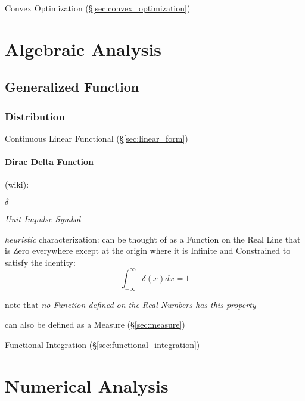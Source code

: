 Convex Optimization (\S\ref{sec:convex_optimization})



\section{Algebraic Analysis}\label{sec:algebraic_analysis}

\subsection{Generalized Function}\label{sec:generalized_function}

\subsubsection{Distribution}\label{sec:distribution}

Continuous Linear Functional (\S\ref{sec:linear_form})



\paragraph{Dirac Delta Function}\label{sec:dirac_delta}\hfill

(wiki):

$\delta$

\emph{Unit Impulse Symbol}

\emph{heuristic} characterization: can be thought of as a Function on the Real
Line that is Zero everywhere except at the origin where it is Infinite and
Constrained to satisfy the identity:
\[
  \int_{-\infty}^\infty \delta(x) dx = 1
\]

note that \emph{no Function defined on the Real Numbers has this property}

can also be defined as a Measure (\S\ref{sec:measure})

\fist Functional Integration (\S\ref{sec:functional_integration})



\section{Numerical Analysis}\label{sec:numerical_analysis}

